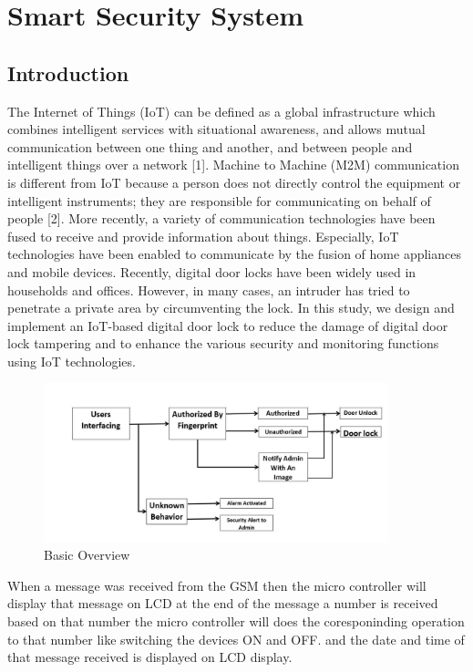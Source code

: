 \documentclass[twoside,a4paper,16pt]{book}
\begin{document}
{{			
			\newpage
			\mainmatter
			\tableofcontents
			\listoffigures
			\listoftables
			
			
			\contentstyleisdeshed
			
			\newpage
			\chapter{Smart Security System}
			\section{Introduction}
			The Internet of Things (IoT) can be defined as a global infrastructure which combines
			intelligent services with situational awareness, and allows mutual communication
			between one thing and another, and between people and intelligent things over a network
			[1]. Machine to Machine (M2M) communication is different from IoT because a person
			does not directly control the equipment or intelligent instruments; they are responsible for
			communicating on behalf of people [2].
			More recently, a variety of communication technologies have been fused to receive and
			provide information about things. Especially, IoT technologies have been enabled to
			communicate by the fusion of home appliances and mobile devices.
			Recently, digital door locks have been widely used in households and offices.
			However, in many cases, an intruder has tried to penetrate a private area by circumventing
			the lock. In this study, we design and implement an IoT-based digital door lock to reduce
			the damage of digital door lock tampering and to enhance the various security and
			monitoring functions using IoT technologies.
			
			\begin{figure}[ht!]
				\begin{center}
					\includegraphics[width=10.0cm]{b1.jpg}
					\caption{Basic Overview}
				\end{center}
			\end{figure}
			When a message was received from the GSM then the micro controller will display that message on LCD at the end
			of the message a number is received based on that number the micro controller will does the coresponinding operation
			to that number like switching the devices ON and OFF. and the date and time of that message received is displayed
			on LCD display.
}}
\end{document}
